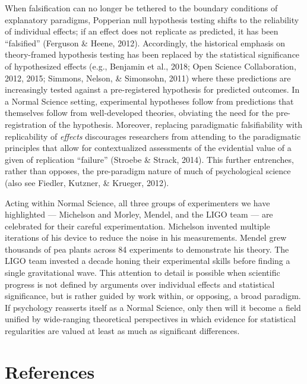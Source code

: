 \documentclass[english,floatsintext,man]{apa6}
\theoremstyle{definition}
\theoremstyle{definition}
\theoremstyle{definition}
\theoremstyle{remark}
\begin{document}
When falsification can no longer be tethered to the boundary conditions
of explanatory paradigms, Popperian null hypothesis testing shifts to
the reliability of individual effects; if an effect does not replicate
as predicted, it has been \enquote{falsified} (Ferguson \& Heene, 2012).
Accordingly, the historical emphasis on theory-framed hypothesis testing
has been replaced by the statistical significance of hypothesized
effects (e.g., Benjamin et al., 2018; Open Science Collaboration, 2012,
2015; Simmons, Nelson, \& Simonsohn, 2011) where these predictions are
increasingly tested against a pre-registered hypothesis for predicted
outcomes. In a Normal Science setting, experimental hypotheses follow
from predictions that themselves follow from well-developed theories,
obviating the need for the pre-registration of the hypothesis. Moreover,
replacing paradigmatic falsifiability with replicability of
\emph{effects} discourages researchers from attending to the
paradigmatic principles that allow for contextualized assessments of the
evidential value of a given of replication \enquote{failure} (Stroebe \&
Strack, 2014). This further entrenches, rather than opposes, the
pre-paradigm nature of much of psychological science (also see Fiedler,
Kutzner, \& Krueger, 2012).

Acting within Normal Science, all three groups of experimenters we have
highlighted --- Michelson and Morley, Mendel, and the LIGO team --- are
celebrated for their careful experimentation. Michelson invented
multiple iterations of his device to reduce the noise in his
measurements. Mendel grew thousands of pea plants across 84 experiments
to demonstrate his theory. The LIGO team invested a decade honing their
experimental skills before finding a single gravitational wave. This
attention to detail is possible when scientific progress is not defined
by arguments over individual effects and statistical significance, but
is rather guided by work within, or opposing, a broad paradigm. If
psychology reasserts itself as a Normal Science, only then will it
become a field unified by wide-ranging theoretical perspectives in which
evidence for statistical regularities are valued at least as much as
significant differences.

\newpage

\hypertarget{references}{%
\section{References}\label{references}}
\end{document}
